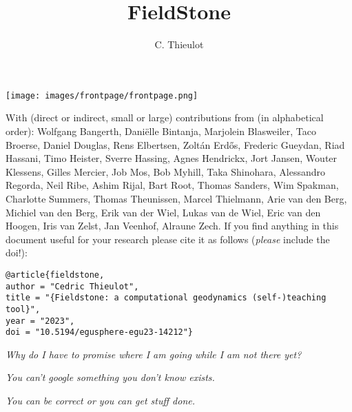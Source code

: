 \documentclass[a4paper,12pt]{report}
\title{FieldStone}
\author{C. Thieulot}
\begin{document}
\thispagestyle{empty}
\texttt{[image: images/frontpage/frontpage.png]}

{\scriptsize With (direct or indirect, small or large) contributions 
from (in alphabetical order): 
Wolfgang Bangerth, 
Dani\"elle Bintanja,
Marjolein Blasweiler,
Taco Broerse,
Daniel Douglas,
Rens Elbertsen,
Zolt{\'a}n Erd{\H{o}}s, 
Frederic Gueydan,
Riad Hassani,
Timo Heister,
Sverre Hassing,
Agnes Hendrickx,
Jort Jansen,
Wouter Klessens,
Gilles Mercier,
Job Mos, 
Bob Myhill,
Taka Shinohara, 
Alessandro Regorda,
Neil Ribe,
Ashim Rijal,
Bart Root,
Thomas Sanders,
Wim Spakman,
Charlotte Summers,
Thomas Theunissen,
Marcel Thielmann,
Arie van den Berg,
Michiel van den Berg,
Erik van der Wiel, 
Lukas van de Wiel, 
Eric van den Hoogen, 
Iris van Zelst,
Jan Veenhof,
Alraune Zech.}
\newpage
If you find anything in this document useful for your research please cite it 
as follows ({\it please} include the doi!):

\begin{verbatim}
@article{fieldstone,
author = "Cedric Thieulot",
title = "{Fieldstone: a computational geodynamics (self-)teaching tool}",
year = "2023",
doi = "10.5194/egusphere-egu23-14212"}
\end{verbatim}

\vspace{7cm}

\begin{center}
{\sl Why do I have to promise where I am going while I am not there yet?}

\vspace{1cm}

{\sl You can't google something you don't know exists.}

\vspace{1cm}

{\sl You can be correct or you can get stuff done.}
\end{center}

\clearpage
\tableofcontents

\end{document}
